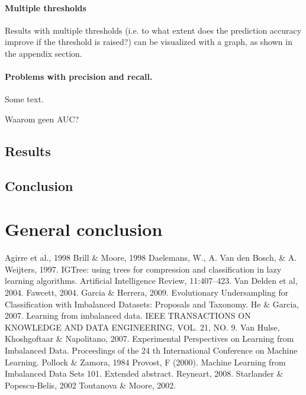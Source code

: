\documentclass[12pt]{article}
\let\stdsection\section
\renewcommand\section{\newpage\stdsection}
\begin{document}
\paragraph{Multiple thresholds} Results with multiple thresholds (i.e. to what extent does the prediction accuracy improve if the threshold is raised?) can be visualized with a graph, as shown in the appendix section.

\paragraph{Problems with precision and recall.} Some text.

Waarom geen AUC?

\subsection{Results}

\subsection{Conclusion}

\section{General conclusion}%


\begin{thebibliography}{99}

Agirre et al., 1998
Brill \& Moore, 1998
Daelemans, W., A. Van den Bosch, \& A. Weijters, 1997. IGTree: using trees for compression and classification in lazy learning algorithms. Artificial Intelligence Review, 11:407–423.
Van Delden et al, 2004.
Fawcett, 2004.
Garcia \& Herrera, 2009. Evolutionary Undersampling for Classification with Imbalanced Datasets: Proposals and Taxonomy.
He \& Garcia, 2007. Learning from imbalanced data. IEEE TRANSACTIONS ON KNOWLEDGE AND DATA ENGINEERING, VOL. 21, NO. 9.
Van Hulse, Khoshgoftaar \& Napolitano, 2007. Experimental Perspectives on Learning from Imbalanced Data. Proceedings of the 24 th International Conference on Machine Learning.
Pollock \& Zamora, 1984
Provost, F (2000). Machine Learning from Imbalanced Data Sets 101. Extended abstract. 
Reyneart, 2008.
Starlander \& Popescu-Belis, 2002
Toutanova \& Moore, 2002.

\end{thebibliography}

\end{document}
